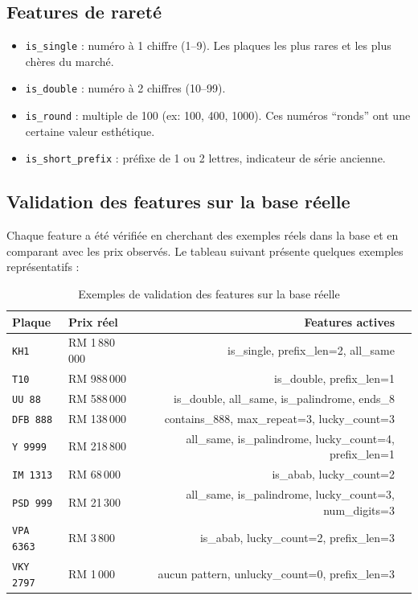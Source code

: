 \documentclass[12pt, a4paper]{article}
\begin{document}
\subsection{Features de rareté}

\begin{itemize}
  \item \texttt{is\_single} : numéro à 1 chiffre (1--9). Les plaques les plus rares et les plus chères du marché.
  \item \texttt{is\_double} : numéro à 2 chiffres (10--99).
  \item \texttt{is\_round} : multiple de 100 (ex: 100, 400, 1000). Ces numéros ``ronds'' ont une certaine valeur esthétique.
  \item \texttt{is\_short\_prefix} : préfixe de 1 ou 2 lettres, indicateur de série ancienne.
\end{itemize}

\subsection{Validation des features sur la base réelle}

Chaque feature a été vérifiée en cherchant des exemples réels dans la base et en comparant avec les prix observés. Le tableau suivant présente quelques exemples représentatifs :

\begin{table}[H]
\centering
\begin{tabular}{llrp{6cm}}
\toprule
\textbf{Plaque} & \textbf{Prix réel} & \textbf{Features actives} \\
\midrule
\texttt{KH1} & RM 1\,880\,000 & is\_single, prefix\_len=2, all\_same \\
\texttt{T10} & RM 988\,000 & is\_double, prefix\_len=1 \\
\texttt{UU 88} & RM 588\,000 & is\_double, all\_same, is\_palindrome, ends\_8 \\
\texttt{DFB 888} & RM 138\,000 & contains\_888, max\_repeat=3, lucky\_count=3 \\
\texttt{Y 9999} & RM 218\,800 & all\_same, is\_palindrome, lucky\_count=4, prefix\_len=1 \\
\texttt{IM 1313} & RM 68\,000 & is\_abab, lucky\_count=2 \\
\texttt{PSD 999} & RM 21\,300 & all\_same, is\_palindrome, lucky\_count=3, num\_digits=3 \\
\texttt{VPA 6363} & RM 3\,800 & is\_abab, lucky\_count=2, prefix\_len=3 \\
\texttt{VKY 2797} & RM 1\,000 & aucun pattern, unlucky\_count=0, prefix\_len=3 \\
\bottomrule
\end{tabular}
\caption{Exemples de validation des features sur la base réelle}
\end{table}
\end{document}
